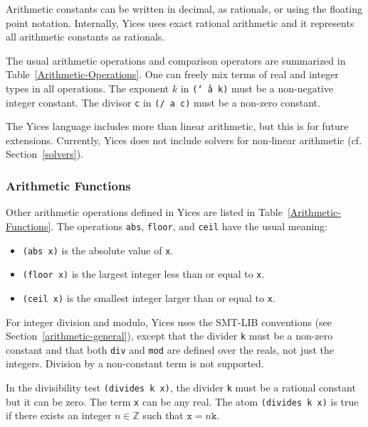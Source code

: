 \documentclass[11pt,twoside,fleqn,openright,titlepage]{cslreport}
\newcommand{\integers}{\ensuremath{\mathbb{Z}}}
\begin{document}
Arithmetic constants can be written in decimal, as rationals, or using
the floating point notation. Internally, Yices uses exact rational
arithmetic and it represents all arithmetic constants as rationals.

\medskip\noindent
The usual arithmetic operations and comparison operators are
summarized in Table~\ref{Arithmetic-Operations}. One can freely mix
terms of real and integer types in all operations. The exponent $k$ in
\texttt{(\char`\^\ a k)} must be a non-negative integer constant. The
divisor \texttt{c} in \texttt{(/ a c)} must be a non-zero constant.


\medskip\noindent
The Yices language includes more than linear arithmetic, but this is
for future extensions. Currently, Yices does not include solvers for
non-linear arithmetic (cf. Section~\ref{solvers}).

\subsubsection*{Arithmetic Functions}

Other arithmetic operations defined in Yices are listed in Table~\ref{Arithmetic-Functions}.
The operations \texttt{abs}, \texttt{floor}, and \texttt{ceil} have the usual meaning:
\begin{itemize}
\item \texttt{(abs x)} is the absolute value of \texttt{x}.
\item \texttt{(floor x)} is the largest integer less than or equal to \texttt{x}.
\item \texttt{(ceil x)} is the smallest integer larger than or equal to \texttt{x}.
\end{itemize}
For integer division and modulo, Yices uses the SMT-LIB conventions (see
Section~\ref{arithmetic-general}), except that the divider \texttt{k}
must be a non-zero constant and that both \texttt{div} and
\texttt{mod} are defined over the reals, not just the integers.
Division by a non-constant term is not supported.

\medskip\noindent In the divisibility test \texttt{(divides k x)}, the
divider \texttt{k} must be a rational constant but it can be zero. The
term \texttt{x} can be any real. The atom \texttt{(divides k x)} is
true if there exists an integer $n\in\integers$ such that $\mathtt{x} = n
\mathtt{k}$.
\end{document}

